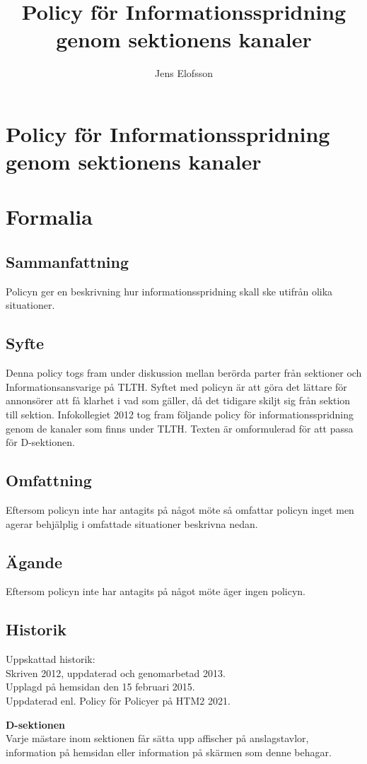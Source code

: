 \documentclass{dsekprotokoll}
\title{Policy för Informationsspridning genom sektionens kanaler}
\author{Jens Elofsson}
\begin{document}
\section*{Policy för Informationsspridning genom sektionens kanaler}
\section{Formalia}
\subsection{Sammanfattning}
Policyn ger en beskrivning hur informationsspridning skall ske utifrån olika situationer.
\subsection{Syfte}
Denna policy togs fram under diskussion mellan berörda parter från sektioner och Informationsansvarige på TLTH. Syftet med policyn är att göra det lättare för annonsörer att få klarhet i vad som gäller, då det tidigare skiljt sig från sektion till sektion. Infokollegiet 2012 tog fram följande policy för informationsspridning genom de kanaler som finns under TLTH. Texten är omformulerad för att passa för D-sektionen.

\subsection{Omfattning}
Eftersom policyn inte har antagits på något möte så omfattar policyn inget men agerar behjälplig i omfattade situationer beskrivna nedan.
\subsection{Ägande}
Eftersom policyn inte har antagits på något möte äger ingen policyn.
\subsection{Historik}
Uppskattad historik:\\
Skriven 2012, uppdaterad och genomarbetad 2013. \\
Upplagd på hemsidan den 15 februari 2015. \\
Uppdaterad enl. Policy för Policyer på HTM2 2021.


\textbf{D-sektionen}\\
Varje mästare inom sektionen får sätta upp affischer på anslagstavlor, information på
hemsidan eller information på skärmen som denne behagar.
\end{document}
